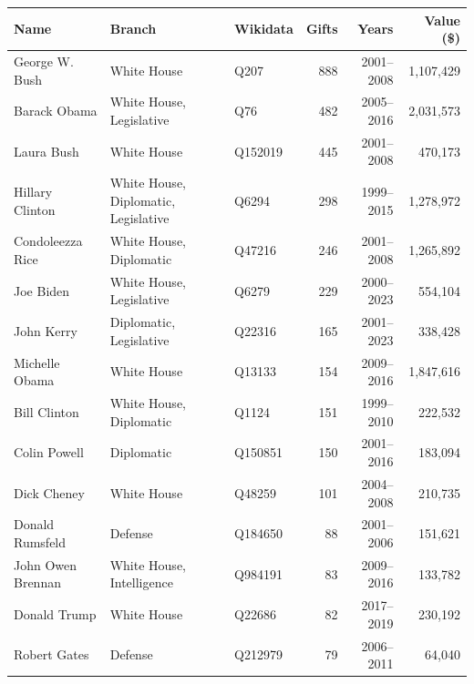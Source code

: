 \begin{tabular}{lllrrr}
\toprule
Name & Branch & Wikidata & Gifts & Years & Value (\$) \\
\midrule
George W. Bush & White House & Q207 & 888 & 2001--2008 & 1,107,429 \\
Barack Obama & White House, Legislative & Q76 & 482 & 2005--2016 & 2,031,573 \\
Laura Bush & White House & Q152019 & 445 & 2001--2008 & 470,173 \\
Hillary Clinton & White House, Diplomatic, Legislative & Q6294 & 298 & 1999--2015 & 1,278,972 \\
Condoleezza Rice & White House, Diplomatic & Q47216 & 246 & 2001--2008 & 1,265,892 \\
Joe Biden & White House, Legislative & Q6279 & 229 & 2000--2023 & 554,104 \\
John Kerry & Diplomatic, Legislative & Q22316 & 165 & 2001--2023 & 338,428 \\
Michelle Obama & White House & Q13133 & 154 & 2009--2016 & 1,847,616 \\
Bill Clinton & White House, Diplomatic & Q1124 & 151 & 1999--2010 & 222,532 \\
Colin Powell & Diplomatic & Q150851 & 150 & 2001--2016 & 183,094 \\
Dick Cheney & White House & Q48259 & 101 & 2004--2008 & 210,735 \\
Donald Rumsfeld & Defense & Q184650 & 88 & 2001--2006 & 151,621 \\
John Owen Brennan & White House, Intelligence & Q984191 & 83 & 2009--2016 & 133,782 \\
Donald Trump & White House & Q22686 & 82 & 2017--2019 & 230,192 \\
Robert Gates & Defense & Q212979 & 79 & 2006--2011 & 64,040 \\
\bottomrule
\end{tabular}
